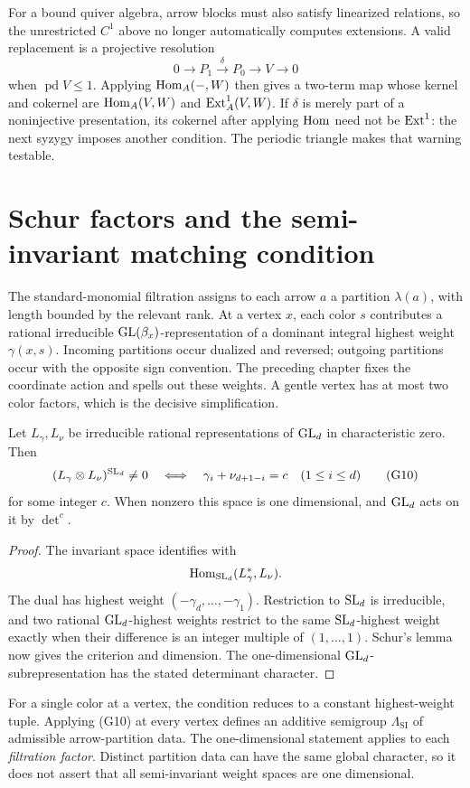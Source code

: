 For a bound quiver algebra, arrow blocks must also satisfy linearized relations, so the unrestricted \(C^1\) above no longer automatically computes extensions. A valid replacement is a projective resolution
\[
 0\longrightarrow P_1\xrightarrow{\delta}P_0\longrightarrow V\longrightarrow0
\]
when \(\operatorname{pd}V\le1\). Applying \(\operatorname{Hom}_A(-,W)\) then gives a two-term map whose kernel and cokernel are \(\operatorname{Hom}_A(V,W)\) and \(\operatorname{Ext}^1_A(V,W)\). If \(\delta\) is merely part of a noninjective presentation, its cokernel after applying \(\operatorname{Hom}\) need not be \(\operatorname{Ext}^1\): the next syzygy imposes another condition. The periodic triangle makes that warning testable.

\section{Schur factors and the semi-invariant matching condition}
The standard-monomial filtration assigns to each arrow \(a\) a partition \(\lambda(a)\), with length bounded by the relevant rank. At a vertex \(x\), each color \(s\) contributes a rational irreducible \(\operatorname{GL}(\beta_x)\)-representation of a dominant integral highest weight \(\gamma(x,s)\). Incoming partitions occur dualized and reversed; outgoing partitions occur with the opposite sign convention. The preceding chapter fixes the coordinate action and spells out these weights. A gentle vertex has at most two color factors, which is the decisive simplification.

\begin{proposition}
Let \(L_\gamma,L_\nu\) be irreducible rational representations of \(\operatorname{GL}_d\) in characteristic zero. Then
\[
 (L_\gamma\otimes L_\nu)^{\operatorname{SL}_d}\ne0
 \quad\Longleftrightarrow\quad
 \gamma_i+\nu_{d+1-i}=c\quad(1\le i\le d)
 \tag{G10}
\]
for some integer \(c\). When nonzero this space is one dimensional, and \(\operatorname{GL}_d\) acts on it by \(\det^c\).
\end{proposition}
\begin{proof}
The invariant space identifies with
\[
 \operatorname{Hom}_{\operatorname{SL}_d}(L_\gamma^*,L_\nu).
\]
The dual has highest weight \((-\gamma_d,\ldots,-\gamma_1)\). Restriction to \(\operatorname{SL}_d\) is irreducible, and two rational \(\operatorname{GL}_d\)-highest weights restrict to the same \(\operatorname{SL}_d\)-highest weight exactly when their difference is an integer multiple of \((1,\ldots,1)\). Schur's lemma now gives the criterion and dimension. The one-dimensional \(\operatorname{GL}_d\)-subrepresentation has the stated determinant character.
\end{proof}
For a single color at a vertex, the condition reduces to a constant highest-weight tuple. Applying (G10) at every vertex defines an additive semigroup \(\Lambda_{\mathrm{SI}}\) of admissible arrow-partition data. The one-dimensional statement applies to each \emph{filtration factor}. Distinct partition data can have the same global character, so it does not assert that all semi-invariant weight spaces are one dimensional.

